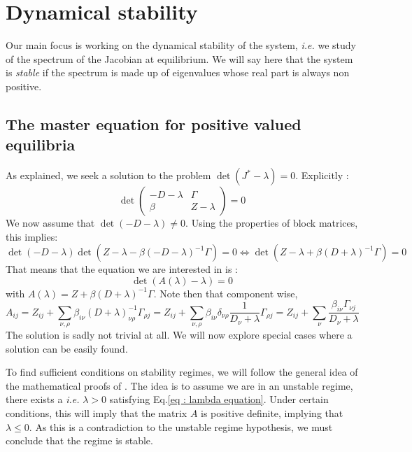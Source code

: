 \documentclass[12pt]{article}
\newcommand{\ie}{\textit{i.e.} }
\begin{document}
	
	
	\clearpage
	\section{Dynamical stability}
	Our main focus is working on the dynamical stability of the system, \ie we study of the spectrum of the Jacobian at equilibrium. We will say here that the system is \textit{stable} if the spectrum is made up of eigenvalues whose real part is always non positive.
		\subsection{The master equation for positive valued equilibria}
	As explained, we seek a solution to the problem $\det\left(J^* - \lambda \right) = 0$. Explicitly :
	\begin{equation}
		\det
		\begin{pmatrix}
			-D - \lambda  & \Gamma \\
			\beta & Z-\lambda 
		\end{pmatrix} = 0
	\end{equation}
	We now assume that $\det\left(-D-\lambda\right)\neq 0$. Using the properties of block matrices, this implies:
	\begin{equation}
		\det\left(-D-\lambda\right)\det\left(Z-\lambda-\beta\left(-D-\lambda\right)^{-1}\Gamma\right) = 0 \iff \det\left(Z-\lambda+\beta\left(D+\lambda\right)^{-1}\Gamma\right) =0 
	\end{equation}
	That means that the equation we are interested in is :
	\begin{equation}
		\boxed{\det\left(A(\lambda)-\lambda\right) =0} \label{eq : lambda equation}
	\end{equation}
	with $A(\lambda) = Z + \beta\left(D+\lambda\right)^{-1}\Gamma$.
	Note then that component wise, 
	\begin{equation}
	A_{ij} = Z_{ij}+\sum_{\nu,\rho} \beta_{i\nu}\left(D+\lambda\right)^{-1}_{\nu\rho}\Gamma_{\rho j} = Z_{ij}+\sum_{\nu, \rho} \beta_{i\nu} \delta_{\nu \rho} \frac{1}{D_\nu + \lambda} \Gamma_{\rho j} = Z_{ij}+\sum_{\nu} \frac{\beta_{i\nu}\Gamma_{\nu j}}{D_\nu + \lambda} \label{eq : Aij definition}
	\end{equation}
	The solution is sadly not trivial at all. We will now explore special cases where a solution can be easily found.
	
	To find sufficient conditions on stability regimes, we will follow the general idea of the mathematical proofs of \cite{Butler:2018aa}. The idea is to assume we are in an unstable regime, there exists a \ie $\lambda > 0$ satisfying Eq.\eqref{eq : lambda equation}. Under certain conditions, this will imply that the matrix $A$ is positive definite, implying that $\lambda \leq 0$. As this is a contradiction to the unstable regime hypothesis, we must conclude that the regime is stable. 
	
\end{document}
